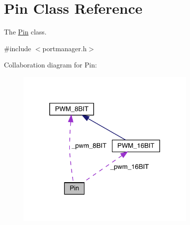 \hypertarget{classPin}{}\section{Pin Class Reference}
\label{classPin}


The \hyperlink{classPin}{Pin} class.  




{\ttfamily \#include $<$portmanager.\+h$>$}



Collaboration diagram for Pin\+:\nopagebreak
\begin{figure}[H]
\begin{center}
\leavevmode
\includegraphics[width=248pt]{classPin__coll__graph}
\end{center}
\end{figure}

